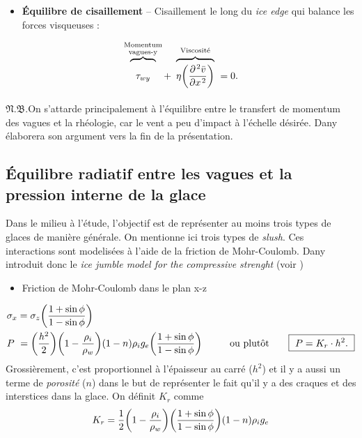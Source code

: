 \documentclass[10pt]{article}
\numberwithin{equation}{section}
\newcommand{\short}{\vphantom{pA}}
\newcommand{\tall}{\vphantom{pA^{x^x}_p}}
\newcommand{\venti}{\vphantom{\sum_x^x}}
\newcommand{\pt}{\hspace{1pt}} %
\newcommand{\nb}{\underline{{\footnotesize\EightStarConvex}\pt $\mathfrak{N.B.}$\vphantom{p}}\hspace{3pt}}
\begin{document}
\begin{itemize}
\item \textbf{Équilibre de cisaillement} -- Cisaillement le long du \emph{ice edge} qui balance les forces visqueuses :
\end{itemize}
\begin{equation}
   \overbrace{\venti\phantom{x}\tau_{wy}\phantom{x}}^{\substack{\text{Momentum}\short\\\text{vagues-y}\short}} +\ \overbrace{\venti\eta\qty(\pdv[\pt2]{\bar{v}}{x})}^{\text{Viscosité}\tall}\ = 0.
\end{equation}

\nb On s'attarde principalement à l'équilibre entre le transfert de momentum des vagues et la rhéologie, car le vent a peu d'impact à l'échelle désirée.
Dany élaborera son argument vers la fin de la présentation.

\subsection{Équilibre radiatif entre les vagues et la pression interne de la glace}
\label{sec:orgca3ca26}

Dans le milieu à l'étude, l'objectif est de représenter au moins trois types de glaces de manière générale.
On mentionne ici trois types de \emph{slush}.
Ces interactions sont modelisées à l'aide de la friction de Mohr-Coulomb. 
Dany introduit donc le \emph{ice jumble model for the compressive strenght} (voir \Textcites{uzuner1976theoretical}[][]{hopkins1999compression}[][]{dai2004wave})

\begin{itemize}
\item Friction de Mohr-Coulomb dans le plan x-z
\end{itemize}
\begin{align}
   & \sigma_x = \sigma_z\qty(\frac{1+\sin \phi}{1-\sin\phi}) \\
   & P\ = \qty(\frac{h^2}{2}) \qty(1-\frac{\rho_i}{\rho_w})(1-n)\rho_ig_e \qty(\frac{1+\sin \phi}{1-\sin\phi}) \hspace{1cm} \text{ou plutôt}\hspace{0.7cm} \boxed{\ P = K_r \cdot h^2.\ } 
\end{align}
Grossièrement, c'est proportionnel à l'épaisseur au carré (\(h^2\)) et il y a aussi un terme de \emph{porosité} (\(n\)) dans le but de représenter le fait qu'il y a des craques et des interstices dans la glace.
On définit \(K_r\) comme
\begin{equation}
   K_r =  \frac{1}{2}\qty(1-\frac{\rho_i}{\rho_w}) \qty(\frac{1+\sin \phi}{1-\sin\phi})(1-n)\rho_ig_e
\end{equation}
\bigskip
\end{document}
